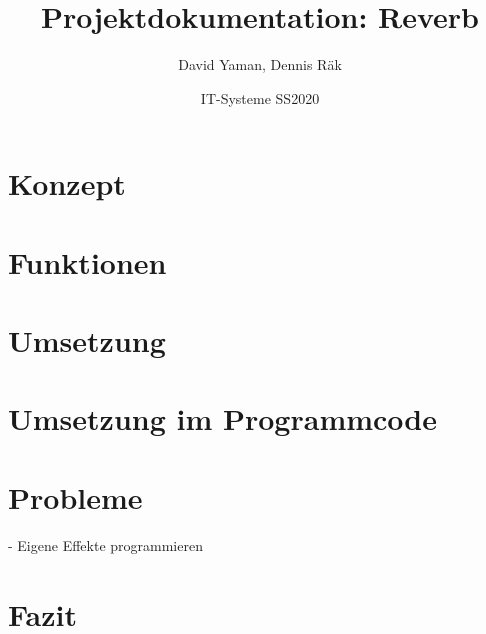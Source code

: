 \documentclass[12pt]{article}
\title{Projektdokumentation: Reverb}        %
\author{David Yaman, Dennis Räk}            %
\date{IT-Systeme SS2020}                    %
\begin{document}
\maketitle
\newpage
\section{Konzept}
\section{Funktionen}
\section{Umsetzung}
\section{Umsetzung im Programmcode}
\section{Probleme}
- Eigene Effekte programmieren
\section{Fazit}
\end{document}
